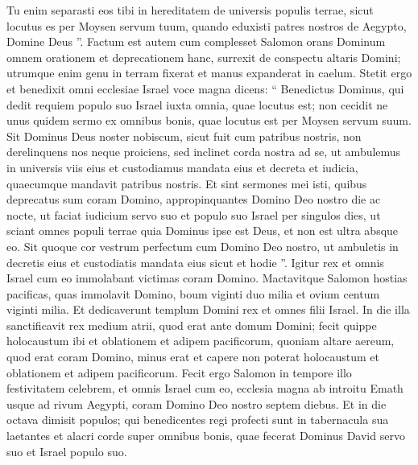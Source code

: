 \begin{biblechapter}
\begin{biblechapter}
\begin{biblechapter}
\begin{biblechapter}
\begin{biblechapter}
\begin{biblechapter}
\begin{biblechapter}
\begin{biblechapter}
\verse Tu enim separasti eos tibi in hereditatem de universis populis terrae, sicut locutus es per Moysen servum tuum, quando eduxisti patres nostros de Aegypto, Domine Deus ”.
 \verse Factum est autem cum complesset Salomon orans Dominum omnem orationem et deprecationem hanc, surrexit de conspectu altaris Domini; utrumque enim genu in terram fixerat et manus expanderat in caelum. 
\verse Stetit ergo et benedixit omni ecclesiae Israel voce magna dicens: 
\verse “ Benedictus Dominus, qui dedit requiem populo suo Israel iuxta omnia, quae locutus est; non cecidit ne unus quidem sermo ex omnibus bonis, quae locutus est per Moysen servum suum. 
\verse Sit Dominus Deus noster nobiscum, sicut fuit cum patribus nostris, non derelinquens nos neque proiciens, 
\verse sed inclinet corda nostra ad se, ut ambulemus in universis viis eius et custodiamus mandata eius et decreta et iudicia, quaecumque mandavit patribus nostris. 
\verse Et sint sermones mei isti, quibus deprecatus sum coram Domino, appropinquantes Domino Deo nostro die ac nocte, ut faciat iudicium servo suo et populo suo Israel per singulos dies, 
 \verse ut sciant omnes populi terrae quia Dominus ipse est Deus, et non est ultra absque eo. 
\verse Sit quoque cor vestrum perfectum cum Domino Deo nostro, ut ambuletis in decretis eius et custodiatis mandata eius sicut et hodie ”.
 \verse Igitur rex et omnis Israel cum eo immolabant victimas coram Domino. 
\verse Mactavitque Salomon hostias pacificas, quas immolavit Domino, boum viginti duo milia et ovium centum viginti milia. Et dedicaverunt templum Domini rex et omnes filii Israel. 
\verse In die illa sanctificavit rex medium atrii, quod erat ante domum Domini; fecit quippe holocaustum ibi et oblationem et adipem pacificorum, quoniam altare aereum, quod erat coram Domino, minus erat et capere non poterat holocaustum et oblationem et adipem pacificorum. 
\verse Fecit ergo Salomon in tempore illo festivitatem celebrem, et omnis Israel cum eo, ecclesia magna ab introitu Emath usque ad rivum Aegypti, coram Domino Deo nostro septem diebus. 
 \verse Et in die octava dimisit populos; qui benedicentes regi profecti sunt in tabernacula sua laetantes et alacri corde super omnibus bonis, quae fecerat Dominus David servo suo et Israel populo suo.
 

\end{biblechapter}
\end{biblechapter}
\end{biblechapter}
\end{biblechapter}
\end{biblechapter}
\end{biblechapter}
\end{biblechapter}
\end{biblechapter}
